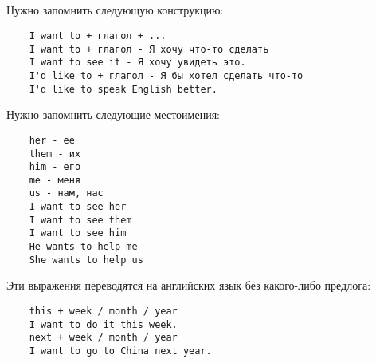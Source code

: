 \subsection*{}
Нужно запомнить следующую конструкцию:
\begin{verbatim}
    I want to + глагол + ...
    I want to + глагол - Я хочу что-то сделать
    I want to see it - Я хочу увидеть это.
    I'd like to + глагол - Я бы хотел сделать что-то
    I'd like to speak English better.
\end{verbatim}

Нужно запомнить следующие местоимения:
\begin{verbatim}
    her - ее
    them - их
    him - его
    me - меня
    us - нам, нас
    I want to see her
    I want to see them
    I want to see him
    He wants to help me
    She wants to help us
\end{verbatim}

Эти выражения переводятся на английских язык без какого-либо предлога:
\begin{verbatim}
    this + week / month / year
    I want to do it this week.
    next + week / month / year
    I want to go to China next year.
\end{verbatim}